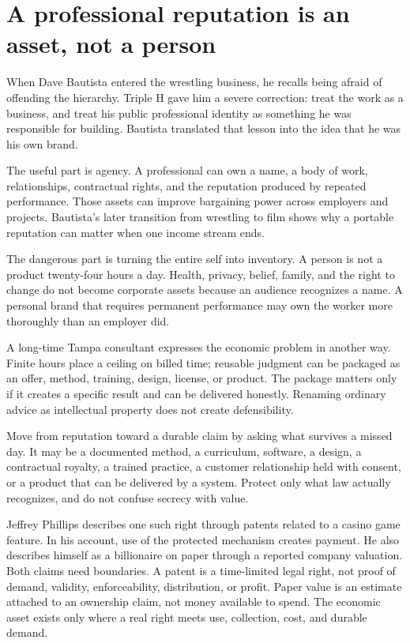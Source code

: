 \section{A professional reputation is an asset, not a person}

When Dave Bautista entered the wrestling business, he recalls being afraid of
offending the hierarchy. Triple H gave him a severe correction: treat the work
as a business, and treat his public professional identity as something he was
responsible for building. Bautista translated that lesson into the idea that
he was his own brand.

The useful part is agency. A professional can own a name, a body of work,
relationships, contractual rights, and the reputation produced by repeated
performance. Those assets can improve bargaining power across employers and
projects. Bautista's later transition from wrestling to film shows why a
portable reputation can matter when one income stream ends.

The dangerous part is turning the entire self into inventory. A person is not
a product twenty-four hours a day. Health, privacy, belief, family, and the
right to change do not become corporate assets because an audience recognizes
a name. A personal brand that requires permanent performance may own the
worker more thoroughly than an employer did.

A long-time Tampa consultant expresses the economic problem in another way.
Finite hours place a ceiling on billed time; reusable judgment can be packaged
as an offer, method, training, design, license, or product. The package matters
only if it creates a specific result and can be delivered honestly. Renaming
ordinary advice as intellectual property does not create defensibility.

Move from reputation toward a durable claim by asking what survives a missed
day. It may be a documented method, a curriculum, software, a design, a
contractual royalty, a trained practice, a customer relationship held with
consent, or a product that can be delivered by a system. Protect only what law
actually recognizes, and do not confuse secrecy with value.

Jeffrey Phillips describes one such right through patents related to a casino
game feature. In his account, use of the protected mechanism creates payment.
He also describes himself as a billionaire on paper through a reported company
valuation. Both claims need boundaries. A patent is a time-limited legal right,
not proof of demand, validity, enforceability, distribution, or profit. Paper
value is an estimate attached to an ownership claim, not money available to
spend. The economic asset exists only where a real right meets use, collection,
cost, and durable demand.

